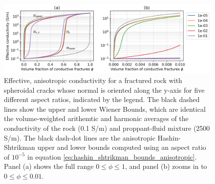 \begin{figure}
    \begin{center}
    \includegraphics[width=\columnwidth]{figures/phys_prop_model/aligned_fractures.png}
    \end{center}
\caption{
    Effective, anisotropic conductivity for a fractured rock with spheroidal
    cracks whose normal is oriented along the y-axis for five different aspect ratios, indicated by the legend.
    The black dashed lines show the upper and lower
    Wiener Bounds, which are identical the volume-weighted arithemtic and harmonic averages of the
    conductivity of the rock (0.1 S/m) and proppant-fluid mixture (2500 S/m). The black dash-dot lines
    are the anisotropic Hashin-Shtrikman upper and lower bounds computed using an aspect ratio of $10^{-5}$ in
    equation \ref{eq:hashin_shtrikman_bounds_anisotropic}.
    Panel (a) shows the
    full range $0 \leq \phi \leq 1$, and panel (b) zooms in to $0 \leq \phi \leq 0.01$.
}
\label{fig:aligned_fractures}
\end{figure}
